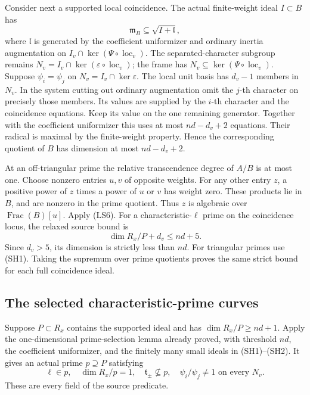 Consider next a supported local coincidence.
The actual finite-weight ideal \(I\subset B\)
has
\[
       \mathfrak m_B\subseteq\sqrt{I+\mathfrak l},
\]
where \(\mathfrak l\) is generated by the
coefficient uniformizer and ordinary
inertia augmentation on
\(I_v\cap\ker(\Psi\circ\operatorname{loc}_v)\).
The separated-character subgroup remains
\(N_v=I_v\cap\ker(\varepsilon\circ\operatorname{loc}_v)\);
the frame has \(N_v\subseteq\ker(\Psi\circ\operatorname{loc}_v)\).
Suppose \(\psi_i=\psi_j\) on
\(N_v=I_v\cap\ker\varepsilon\).
The local unit basis has \(d_v-1\)
members in \(N_v\).
In the system cutting out ordinary
augmentation omit the \(j\)-th character
on precisely those members.
Its values are supplied by the \(i\)-th
character and the coincidence equations.
Keep its value on the one remaining
generator.
Together with the coefficient uniformizer
this uses at most \(nd-d_v+2\) equations.
Their radical is maximal by the
finite-weight property.
Hence the corresponding quotient of \(B\)
has dimension at most \(nd-d_v+2\).

At an off-triangular prime the relative
transcendence degree of \(A/B\) is at most
one.
Choose nonzero entries \(u,v\) of opposite
weights.
For any other entry \(z\), a positive
power of \(z\) times a power of \(u\) or
\(v\) has weight zero.
These products lie in \(B\), and are
nonzero in the prime quotient.
Thus \(z\) is algebraic over
\(\operatorname{Frac}(B)[u]\).
Apply (LS6).
For a characteristic-\(\ell\) prime on
the coincidence locus, the relaxed
source bound is
\[
                         \dim R_x/P+d_v\le nd+5 .             \tag{SH2}
\]
Since \(d_v>5\), its dimension is
strictly less than \(nd\).
For triangular primes use (SH1).
Taking the supremum over prime quotients
proves the same strict bound for each
full coincidence ideal.

\subsection{The selected characteristic-prime curves}
Suppose \(P\subset R_x\) contains the
supported ideal and has
\(\dim R_x/P\ge nd+1\).
Apply the one-dimensional prime-selection
lemma already proved, with threshold \(nd\),
the coefficient uniformizer, and the
finitely many small ideals in (SH1)--(SH2).
It gives an actual prime \(p\supseteq P\)
satisfying
\[
 \ell\in p,\quad \dim R_x/p=1,\quad
 \mathfrak t_\pm\not\subseteq p,\quad
       \psi_i/\psi_j\ne1\text{ on every }N_v.                 \tag{SH3}
\]
These are every field of the source
 predicate.

